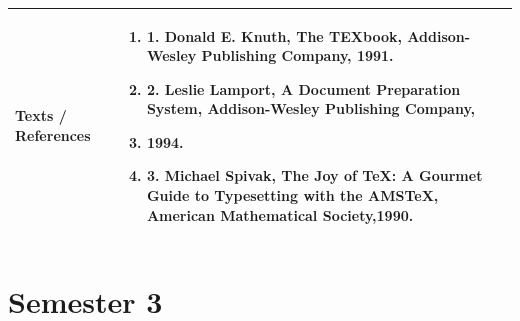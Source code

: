 \documentclass[11pt,a4paper]{article}
\begin{document}
\begin{tabularx}{\textwidth}{|p{3.2cm}|X|}
\hline
\textbf{Texts / References} & \begin{enumerate}[leftmargin=*,noitemsep,topsep=2pt]  \item 1. Donald E. Knuth, The TEXbook, Addison-Wesley Publishing Company, 1991.  \item 2. Leslie Lamport, A Document Preparation System, Addison-Wesley Publishing Company,  \item 1994.  \item 3. Michael Spivak, The Joy of TeX: A Gourmet Guide to Typesetting with the AMSTeX,  American Mathematical Society,1990.\end{enumerate} \\
\hline
\end{tabularx}
\clearpage
\section{Semester 3}
\vspace{10pt}
\clearpage
\end{document}
